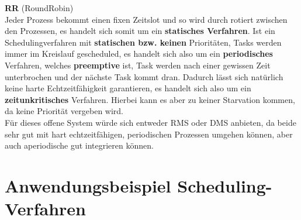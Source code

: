 \documentclass[12pt,a4paper,ngerman]{article}
\begin{document}
\textbf{RR} (RoundRobin)\\
Jeder Prozess bekommt einen fixen Zeitslot und so wird durch rotiert zwischen den Prozessen, es handelt sich somit um ein \textbf{statisches Verfahren}. 
Ist ein  Schedulingverfahren mit \textbf{statischen bzw. keinen} Prioritäten, Tasks werden immer im Kreislauf gescheduled, es handelt sich also um ein \textbf{periodisches} Verfahren, welches \textbf{preemptive} ist, Task werden nach einer gewissen Zeit unterbrochen und der nächste Task kommt dran. Dadurch lässt sich natürlich keine harte Echtzeitfähigkeit garantieren, es handelt sich also um ein \textbf{zeitunkritisches} Verfahren. Hierbei kann es aber zu keiner Starvation kommen, da keine Priorität vergeben wird. \\

\vspace{0.5cm}
Für dieses offene System würde sich entweder RMS oder DMS anbieten, da beide sehr gut mit hart echtzeitfähigen, periodischen Prozessen umgehen können, aber auch aperiodische gut integrieren können. 


\pagebreak

\section*{Anwendungsbeispiel Scheduling-Verfahren}
\end{document}
